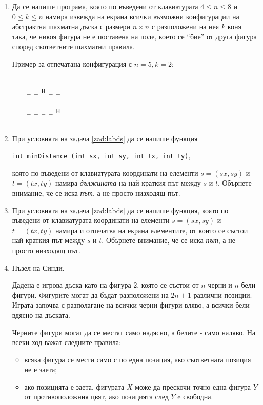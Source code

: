 {\begin{enumerate}[resume]
	Пример: За лабиринта от Фигура \ref{fig:samplelab}(а) условието е изпълнено, но не и за лабиринта от Фигура \ref{fig:samplelab}(б).


	\item Да се напише програма, която по въведени от клавиатурата $4 \le n \le 8$ и $0 \le k \le n$ намира извежда на екрана всички възможни конфигурации на абстрактна шахматна дъска с размери $n \times n$ с разположени на нея $k$ коня така, че никоя фигура не е поставена на поле, което се ``бие'' от друга фигура според съответните шахматни правила.

	Пример за отпечатана конфигурация с $n=5, k=2$:
	\begin{verbatim}
	_ _ _ _ _
	_ _ H _ _
	_ _ _ _ _
	_ _ _ _ H
	_ _ _ _ _

	\end{verbatim}


	\item При условията на задача \ref{zad:labds} да се напише функция

	\texttt{int minDistance (int sx, int sy, int tx, int ty)},

	която по въведени от клавиатурата координати на елементи $s=(sx,sy)$ и $t=(tx,ty)$ намира \textit {дължината} на най-краткия път между $s$ и $t$. Обърнете внимание, че се иска \textit{път}, а не просто низходящ път.

	\item

	При условията на задача \ref{zad:labds} да се напише функция, която по въведени от клавиатурата координати на елементи $s=(sx,sy)$ и $t=(tx,ty)$ намира и отпечатва на екрана елементите, от които се състои най-краткия път между $s$ и $t$. Обърнете внимание, че се иска \textit{път}, а не просто низходящ път.


	\item Пъзел на Синди\cite{cindy}.

	Дадена е игрова дъска като на фигура 2, която се състои от $n$ черни и $n$ бели фигури. Фигурите могат да бъдат разположени на $2n+1$ различни позиции. Играта започва с разполагане на всички черни фигури вляво, а всички бели - вдясно на дъската.

	Черните фигури могат да се местят само надясно, а белите - само наляво. На всеки ход важат следните правила:


	\begin{itemize}
		\item всяка фигура се мести само с по една позиция, ако съответната позиция не е заета;
		\item ако позицията е заета, фигурата $X$ може да прескочи точно една фигура $Y$ от противоположния цвят, ако позицията след $Y$ e свободна.
	\end{itemize}


\end{enumerate}}

